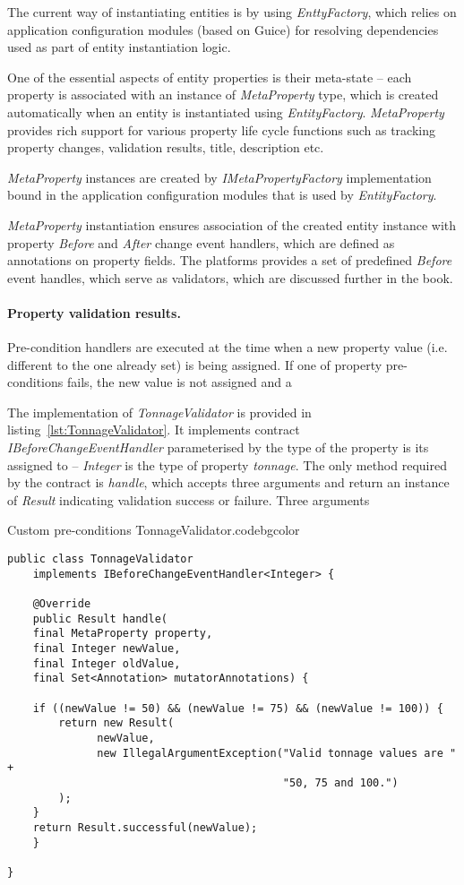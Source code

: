   The current way of instantiating entities is by using \emph{EnttyFactory}, which relies on application configuration modules (based on Guice) for resolving dependencies used as part of entity instantiation logic.

  One of the essential aspects of entity properties is their meta-state -- each property is associated with an instance of \emph{MetaProperty} type, which is created automatically when an entity is instantiated using \emph{EntityFactory}. 
  \emph{MetaProperty} provides rich support for various property life cycle functions such as tracking property changes, validation results, title, description etc.

  \emph{MetaProperty} instances are created by \emph{IMetaPropertyFactory} implementation bound in the application configuration modules that is used by \emph{EntityFactory}.

  \emph{MetaProperty} instantiation ensures association of the created entity instance with property \emph{Before} and \emph{After} change event handlers, which are defined as annotations on property fields. 
  The platforms provides a set of predefined \emph{Before} event handles, which serve as validators, which are discussed further in the book. 
  

  \paragraph*{Property validation results.}

  Pre-condition handlers are executed at the time when a new property value (i.e. different to the one already set) is being assigned.
  If one of property pre-conditions fails, the new value is not assigned and a

  The implementation of \emph{TonnageValidator} is provided in listing~\ref{lst:TonnageValidator}.
  It implements contract \emph{IBeforeChangeEventHandler} parameterised by the type of the property is its assigned to -- \emph{Integer} is the type of property \emph{tonnage}.
  The only method required by the contract is \emph{handle}, which accepts three arguments and return an instance of \emph{Result} indicating validation success or failure.
  Three arguments

  \begin{code}{Custom pre-conditions TonnageValidator.}{\label{lst:TonnageValidator}}{codebgcolor}
    \begin{lstlisting}
public class TonnageValidator 
    implements IBeforeChangeEventHandler<Integer> {

    @Override
    public Result handle(
	final MetaProperty property, 
	final Integer newValue, 
	final Integer oldValue, 
	final Set<Annotation> mutatorAnnotations) {
	
	if ((newValue != 50) && (newValue != 75) && (newValue != 100)) {
	    return new Result(
		      newValue, 
		      new IllegalArgumentException("Valid tonnage values are " +
	    		                           "50, 75 and 100.")
	    );
	}
	return Result.successful(newValue);
    }

}
    \end{lstlisting}
  \end{code}



